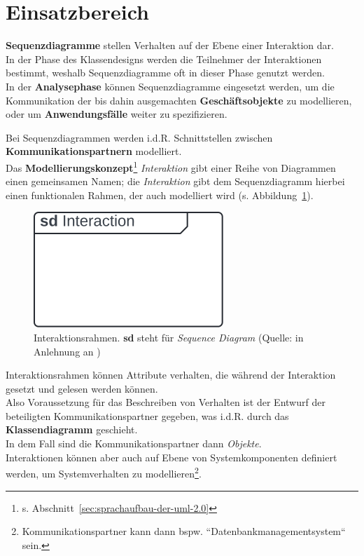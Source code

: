 \section{Einsatzbereich}

\begin{tcolorbox}[title=Sequenzdiagramm]
    \textbf{Sequenzdiagramme} stellen Verhalten auf der Ebene einer Interaktion dar.\\
    In der Phase des Klassendesigns werden die Teilnehmer der Interaktionen bestimmt, weshalb Sequenzdiagramme oft in dieser Phase genutzt werden.\\
    In der \textbf{Analysephase} können Sequenzdiagramme eingesetzt werden, um die Kommunikation der bis dahin ausgemachten \textbf{Geschäftsobjekte} zu modellieren, oder um \textbf{Anwendungsfälle} weiter zu spezifizieren.
\end{tcolorbox}

\noindent
Bei Sequenzdiagrammen werden i.d.R. Schnittstellen zwischen \textbf{Kommunikationspartnern} modelliert.\\

\noindent
Das \textbf{Modellierungskonzept}\footnote{
s. Abschnitt~\ref{sec:sprachaufbau-der-uml-2.0}
} \textit{Interaktion} gibt einer Reihe von Diagrammen einen gemeinsamen Namen; die \textit{Interaktion} gibt dem Sequenzdiagramm hierbei einen funktionalen Rahmen, der auch modelliert wird (s. Abbildung~\ref{fig:interaktionsrahmen}).\\

\begin{figure}
    \centering
    \includegraphics[scale=0.5]{part three/Sequenzdiagramme/img/interaktionsrahmen}
    \caption{Interaktionsrahmen. \textbf{sd} steht für \textit{Sequence Diagram} (Quelle: in Anlehnung an \cite[596]{OMG17})}
    \label{fig:interaktionsrahmen}
\end{figure}

\noindent
Interaktionsrahmen können Attribute verhalten, die während der Interaktion gesetzt und gelesen werden können.\\

\noindent
Also Voraussetzung für das Beschreiben von Verhalten ist der Entwurf der beteiligten Kommunikationspartner gegeben, was i.d.R. durch das \textbf{Klassendiagramm} geschieht.\\
In dem Fall sind die Kommunikationspartner dann \textit{Objekte}.\\

\noindent
Interaktionen können aber auch auf Ebene von Systemkomponenten definiert werden, um Systemverhalten zu modellieren\footnote{
Kommunikationspartner kann dann bspw. ``Datenbankmanagementsystem`` sein.
}.
